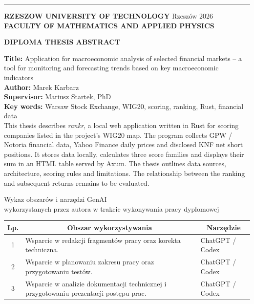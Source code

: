 \documentclass[12pt,a4paper,twoside]{report}
\newcommand{\AuthorName}{Marek Karbarz}
\newcommand{\ThesisYear}{2026}
\newcommand{\ThesisTitleEnglish}{Application for macroeconomic analysis of selected financial markets – a tool for monitoring and forecasting trends based on key macroeconomic indicators}
\begin{document}
\vfill
\noindent\rule{\textwidth}{2pt}

\textbf{RZESZOW UNIVERSITY OF TECHNOLOGY} \hfill Rzeszów \ThesisYear \\
\textbf{FACULTY OF MATHEMATICS AND APPLIED PHYSICS} \\

\begin{center}
    \textbf{DIPLOMA THESIS ABSTRACT}
\end{center}

\textbf{Title:} \ThesisTitleEnglish \\
\textbf{Author:} \AuthorName \\
\textbf{Supervisor:} Mariusz Startek, PhD \\
\textbf{Key words:} Warsaw Stock Exchange, WIG20, scoring, ranking, Rust, financial data
\\

This thesis describes \textit{rankr}, a local web application written in Rust for scoring companies listed in the project's WIG20 map. The program collects GPW / Notoria financial data, Yahoo Finance daily prices and disclosed KNF net short positions. It stores data locally, calculates three score families and displays their sum in an HTML table served by Axum. The thesis outlines data sources, architecture, scoring rules and limitations. The relationship between the ranking and subsequent returns remains to be evaluated.

\vfill
\clearpage
\endgroup

\cleardoublepage
\thispagestyle{empty}
{}

\begin{center}
    Wykaz obszarów i narzędzi GenAI \\
    wykorzystanych przez autora w trakcie wykonywania pracy dyplomowej
\end{center}

\begin{table}[htbp]
    \centering
    \begin{tabularx}{\linewidth}{|c|X|X|}\hline
       \textbf{Lp.} & \multicolumn{1}{c|}{\textbf{Obszar wykorzystywania}} & \multicolumn{1}{c|}{\textbf{Narzędzie}} \\ \hline
       1 & Wsparcie w redakcji fragmentów pracy oraz korekta techniczna. & ChatGPT / Codex \\ \hline
       2 & Wsparcie w planowaniu zakresu pracy oraz przygotowaniu testów. & ChatGPT / Codex \\ \hline
       3 & Wsparcie w analizie dokumentacji technicznej i przygotowaniu prezentacji postępu prac. & ChatGPT / Codex \\ \hline
    \end{tabularx}
\end{table}
\end{document}
